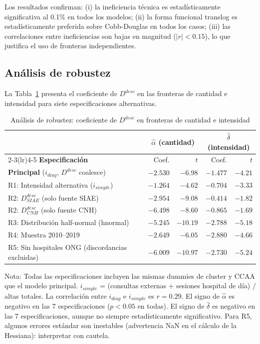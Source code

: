 \documentclass[12pt, a4paper]{article}
\begin{document}
Los resultados confirman: (i) la ineficiencia técnica
es estadísticamente significativa al 0.1\% en todos
los modelos; (ii) la forma funcional translog es
estadísticamente preferida sobre Cobb-Douglas en todos
los casos; (iii) las correlaciones entre ineficiencias
son bajas en magnitud ($|r| < 0.15$), lo que justifica
el uso de fronteras independientes.

\subsection{Análisis de robustez}

La Tabla~\ref{tab:robustez} presenta el coeficiente de
$D^{desc}$ en las fronteras de cantidad e intensidad
para siete especificaciones alternativas.

\begin{table}[h!]
\centering
\caption{Análisis de robustez: coeficiente de
$D^{desc}$ en fronteras de cantidad e intensidad}
\label{tab:robustez}
\begin{threeparttable}
\begin{tabular}{lrrrr}
\toprule
& \multicolumn{2}{c}{\textbf{$\hat{\alpha}$ (cantidad)}}
& \multicolumn{2}{c}{\textbf{$\hat{\delta}$ (intensidad)}} \\
\cmidrule(lr){2-3}\cmidrule(lr){4-5}
\textbf{Especificación} & Coef. & $t$
  & Coef. & $t$ \\
\midrule
\textbf{Principal} ($i_{diag}$, $D^{desc}$ coalesce)
  & $-2.530$ & $-6.98$ & $-1.477$ & $-4.21$ \\[4pt]
R1: Intensidad alternativa ($i_{simple}$)
  & $-1.264$ & $-4.62$ & $-0.704$ & $-3.33$ \\
R2: $D^{desc}_{SIAE}$ (solo fuente SIAE)
  & $-2.954$ & $-9.08$ & $-0.414$ & $-1.82$ \\
R2: $D^{desc}_{CNH}$ (solo fuente CNH)
  & $-6.498$ & $-8.60$ & $-0.865$ & $-1.69$ \\
R3: Distribución half-normal (hnormal)
  & $-5.245$ & $-10.19$ & $-2.788$ & $-5.18$ \\
R4: Muestra 2010--2019
  & $-2.649$ & $-6.05$ & $-2.880$ & $-4.66$ \\
R5: Sin hospitales ONG (discordancias excluidas)
  & $-6.009$ & $-10.97$ & $-2.730$ & $-5.24$ \\
\bottomrule
\end{tabular}
\begin{tablenotes}
  \small
  \item Nota: Todas las especificaciones incluyen las
    mismas dummies de cluster y CCAA que el modelo
    principal. $i_{simple}$ = (consultas externas +
    sesiones hospital de día) / altas totales.
    La correlación entre $i_{diag}$ e $i_{simple}$
    es $r = 0.29$.
    El signo de $\hat{\alpha}$ es negativo en las
    7 especificaciones ($p < 0.05$ en todas).
    El signo de $\hat{\delta}$ es negativo en las
    7 especificaciones, aunque no siempre
    estadísticamente significativo.
    Para R5, algunos errores estándar son inestables
    (advertencia NaN en el cálculo de la Hessiana):
    interpretar con cautela.
\end{tablenotes}
\end{threeparttable}
\end{table}
\end{document}
